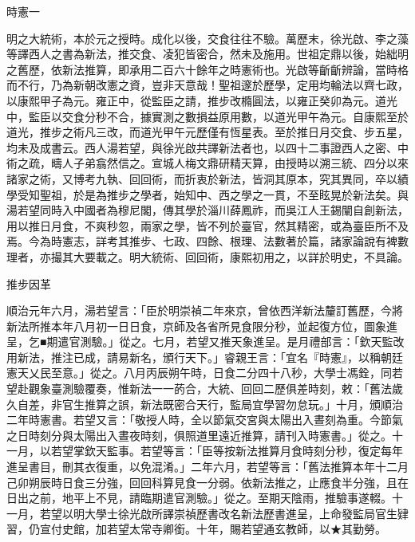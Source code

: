 
\begin{pinyinscope}
時憲一

明之大統術，本於元之授時。成化以後，交食往往不驗。萬歷末，徐光啟、李之藻等譯西人之書為新法，推交食、凌犯皆密合，然未及施用。世祖定鼎以後，始絀明之舊歷，依新法推算，即承用二百六十餘年之時憲術也。光啟等齗齗辨論，當時格而不行，乃為新朝改憲之資，豈非天意哉！聖祖邃於歷學，定用均輪法以齊七政，以康熙甲子為元。雍正中，從監臣之請，推步改橢圓法，以雍正癸卯為元。道光中，監臣以交食分秒不合，據實測之數損益原用數，以道光甲午為元。自康熙至於道光，推步之術凡三改，而道光甲午元歷僅有恆星表。至於推日月交食、步五星，均未及成書云。西人湯若望，與徐光啟共譯新法者也，以四十二事證西人之密、中術之疏，疇人子弟翕然信之。宣城人梅文鼎研精天算，由授時以溯三統、四分以來諸家之術，又博考九執、回回術，而折衷於新法，皆洞其原本，究其異同，卒以績學受知聖祖，於是為推步之學者，始知中、西之學之一貫，不至眩晃於新法矣。與湯若望同時入中國者為穆尼閣，傳其學於淄川薛鳳祚，而吳江人王錫闡自創新法，用以推日月食，不爽秒忽，兩家之學，皆不列於臺官，然其精密，或為臺臣所不及焉。今為時憲志，詳考其推步、七政、四餘、根理、法數著於篇，諸家論說有裨數理者，亦撮其大要載之。明大統術、回回術，康熙初用之，以詳於明史，不具論。

推步因革

順治元年六月，湯若望言：「臣於明崇禎二年來京，曾依西洋新法釐訂舊歷，今將新法所推本年八月初一日日食，京師及各省所見食限分秒，並起復方位，圖象進呈，乞■期遣官測驗。」從之。七月，若望又推天象進呈。是月禮部言：「欽天監改用新法，推注已成，請易新名，頒行天下。」睿親王言：「宜名『時憲』，以稱朝廷憲天乂民至意。」從之。八月丙辰朔午時，日食二分四十八秒，大學士馮銓，同若望赴觀象臺測驗覆奏，惟新法一一菂合，大統、回回二歷俱差時刻，敕：「舊法歲久自差，非官生推算之誤，新法既密合天行，監局宜學習勿怠玩。」十月，頒順治二年時憲書。若望又言：「敬授人時，全以節氣交宮與太陽出入晝刻為重。今節氣之日時刻分與太陽出入晝夜時刻，俱照道里遠近推算，請刊入時憲書。」從之。十一月，以若望掌欽天監事。若望等言：「臣等按新法推算月食時刻分秒，復定每年進呈書目，刪其衣復重，以免混淆。」二年六月，若望等言：「舊法推算本年十二月己卯朔辰時日食三分強，回回科算見食一分弱。依新法推之，止應食半分強，且在日出之前，地平上不見，請臨期遣官測驗。」從之。至期天陰雨，推驗事遂輟。十一月，若望以明大學士徐光啟所譯崇禎歷書改名新法歷書進呈，上命發監局官生肄習，仍宣付史館，加若望太常寺卿銜。十年，賜若望通玄教師，以★其勤勞。


\end{pinyinscope}
